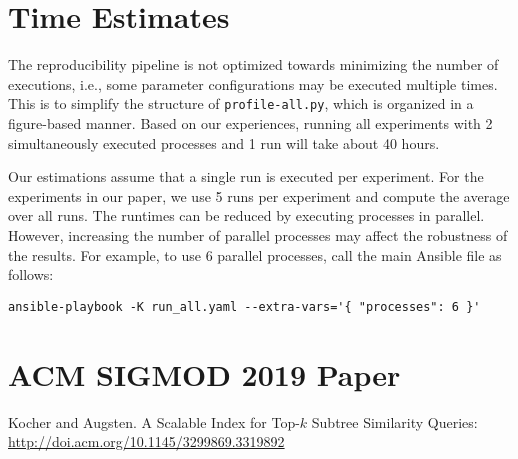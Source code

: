 \documentclass[a4, 10pt]{article}
\begin{document}
\section{Time Estimates}

The reproducibility pipeline is not optimized towards minimizing the number of executions, i.e., some parameter configurations may be executed multiple times. This is to simplify the structure of \texttt{profile-all.py}, which is organized in a figure-based manner. Based on our experiences, running all experiments with 2 simultaneously executed processes and 1 run will take about 40 hours.



Our estimations assume that a single run is executed per experiment. For the experiments in our paper, we use 5 runs per experiment and compute the average over all runs. The runtimes can be reduced by executing processes in parallel. However, increasing the number of parallel processes may affect the robustness of the results. For example, to use 6 parallel processes, call the main Ansible file as follows:

\begin{lstlisting}[style=custombash]
ansible-playbook -K run_all.yaml --extra-vars='{ "processes": 6 }'
\end{lstlisting}

\section{ACM SIGMOD 2019 Paper}
\label{sec:acm-sigmod-2019-paper}

Kocher and Augsten. A Scalable Index for Top-$k$ Subtree Similarity Queries: \newline \url{http://doi.acm.org/10.1145/3299869.3319892}



\end{document}
